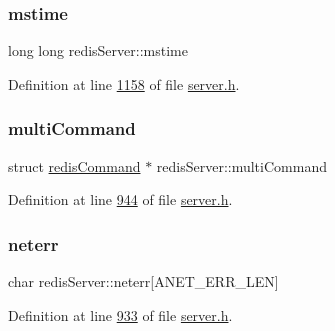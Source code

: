 \mbox{\label{structredisServer_a77a68c95a0beec1cccd5f5bf2178290c}} 
\subsubsection{\texorpdfstring{mstime}{mstime}}
{\footnotesize\ttfamily long long redis\+Server\+::mstime}



Definition at line \hyperlink{server_8h_source_l01158}{1158} of file \hyperlink{server_8h_source}{server.\+h}.

\mbox{\label{structredisServer_ab80b8b1a815996d793d12c56da3bfce5}} 
\subsubsection{\texorpdfstring{multi\+Command}{multiCommand}}
{\footnotesize\ttfamily struct \hyperlink{structredisCommand}{redis\+Command} $\ast$ redis\+Server\+::multi\+Command}



Definition at line \hyperlink{server_8h_source_l00944}{944} of file \hyperlink{server_8h_source}{server.\+h}.

\mbox{\label{structredisServer_ae89b423f5e8a2d5eb84c14ab20fb8135}} 
\subsubsection{\texorpdfstring{neterr}{neterr}}
{\footnotesize\ttfamily char redis\+Server\+::neterr\mbox{[}A\+N\+E\+T\+\_\+\+E\+R\+R\+\_\+\+L\+EN\mbox{]}}



Definition at line \hyperlink{server_8h_source_l00933}{933} of file \hyperlink{server_8h_source}{server.\+h}.

\mbox{\label{structredisServer_a4a8a59567abee5bf6a81a4789b55a635}} 
